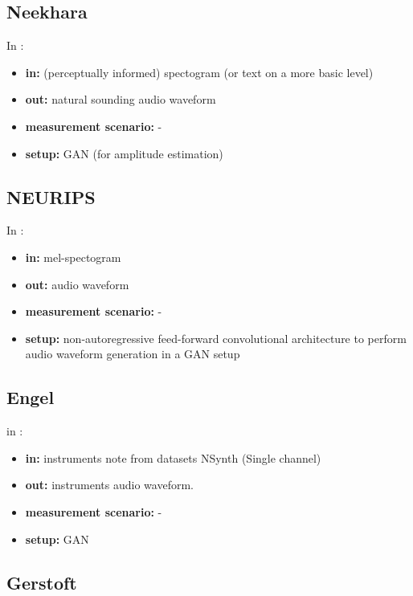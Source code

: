 \documentclass{article}
\begin{document}
\subsection{Neekhara}

In \cite{neekhara2019expediting}:

\begin{itemize}
    \item \textbf{in:} (perceptually informed) spectogram (or text on a more basic level)
    \item \textbf{out:} natural sounding audio waveform
    \item \textbf{measurement scenario:} -
    \item \textbf{setup:} GAN (for amplitude estimation)
\end{itemize}

\subsection{NEURIPS}

In \cite{NEURIPS2019_6804c9bc}:

\begin{itemize}
    \item \textbf{in:} mel-spectogram 
    \item \textbf{out:} audio waveform
    \item \textbf{measurement scenario:} -
    \item \textbf{setup:} non-autoregressive feed-forward convolutional architecture to
    perform audio waveform generation in a GAN setup
\end{itemize}

\subsection{Engel}

in \cite{engel2019gansynth}:

\begin{itemize}
    \item \textbf{in:} instruments note from datasets NSynth (Single channel)
    \item \textbf{out:} instruments audio waveform.
    \item \textbf{measurement scenario:} - 
    \item \textbf{setup:} GAN
\end{itemize}

\subsection{Gerstoft}
\end{document}
